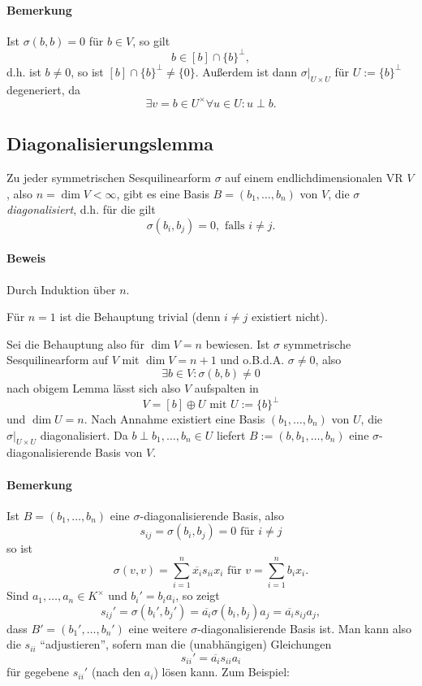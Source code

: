 \paragraph{Bemerkung}
	Ist $ \sigma(b,b) = 0 $ für $ b \in V $, so gilt
		\[ b\in [b]\cap \{b\}^\perp, \]
	d.h. ist $ b\neq 0 $, so ist $ [b]\cap \{b\}^\perp \neq \{0\}$. Außerdem ist dann $ \sigma\big|_{U\times U} $ für $ U:= \{b\}^\perp $ degeneriert, da
		\[ \exists v = b \in U^\times \forall u\in U: u\perp b.\]
		
\subsection{Diagonalisierungslemma}
\begin{Lemma}[Diagonalisierungslemma]
	Zu jeder symmetrischen Sesquilinearform $ \sigma $ auf einem endlichdimensionalen VR $ V $, also $ n = \dim V < \infty $,  gibt es eine Basis $ B = (b_1,\dots,b_n) $ von $ V $, die $ \sigma $ \emph{diagonalisiert}, d.h. für die gilt
		\[ \sigma(b_i,b_j)=0, \text{ falls } i\neq j. \]
\end{Lemma}

\paragraph{Beweis}
	Durch Induktion über $ n $.
	
	Für $ n = 1 $ ist die Behauptung trivial (denn $ i\neq j $ existiert nicht).
	
	Sei die Behauptung also für $\dim V = n $ bewiesen. Ist $ \sigma $ symmetrische Sesquilinearform auf $ V $ mit $ \dim V = n+1 $ und o.B.d.A. $ \sigma \neq 0 $, also
		\[ \exists b\in V: \sigma(b,b) \neq 0 \]
	nach obigem Lemma lässt sich also $ V $ aufspalten in 
		\[ V = [b]\oplus U \text{ mit } U:=\{b\}^\perp \]
	und $ \dim U = n $. Nach Annahme existiert eine Basis $ (b_1,\dots,b_n) $ von $ U $, die $ \sigma|_{U\times U} $ diagonalisiert. Da $ b \perp b_1,\dots,b_n \in U$ liefert $ B := (b,b_1,\dots,b_n) $ eine $ \sigma $-diagonalisierende Basis von $ V $. 
\paragraph{Bemerkung}
	Ist $ B = (b_1,\dots,b_n) $ eine $ \sigma $-diagonalisierende Basis, also
		\[ s_{ij} = \sigma(b_i,b_j) = 0 \text{ für } i\neq j \]
	so ist
		\[ \sigma(v,v) = \sum_{i=1}^{n}\overline{x_i}s_{ii}x_i \text{ für } v = \sum_{i=1}^{n}b_ix_i. \]
	Sind $ a_1,\dots,a_n\in K^\times $ und $ b_i' = b_ia_i $, so zeigt
		\[ s_{ij}' = \sigma(b_i',b_j') = \overline{a_i}\sigma(b_i,b_j)a_j = \overline{a_i}s_{ij}a_j, \]
	dass $ B' = (b_1',\dots,b_n') $ eine weitere $ \sigma $-diagonalisierende Basis ist.
	Man kann also die $ s_{ii} $ "`adjustieren"', sofern man die (unabhängigen) Gleichungen
		\[ s_{ii}' = \overline{a_i}s_{ii}a_i \]
	für gegebene $ s_{ii}' $ (nach den $ a_i $) lösen kann. Zum Beispiel:
